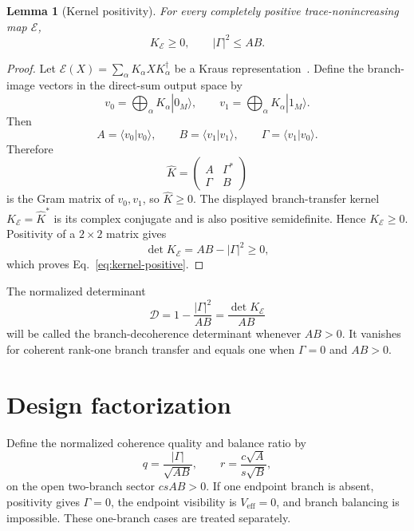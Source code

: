 \documentclass[reprint,aps,pra,superscriptaddress,nofootinbib,longbibliography]{revtex4-2}
\newtheorem{lemma}[theorem]{Lemma}
\newcommand{\ket}[1]{|#1\rangle}
\newcommand{\Veff}{V_{\mathrm{eff}}}
\newcommand{\Ddec}{\mathcal D}
\newcommand{\Kbr}{K_{\mathcal E}}
\begin{document}
\begin{lemma}[Kernel positivity]
For every completely positive trace-nonincreasing map \(\mathcal E\),
\begin{equation}
\Kbr\ge0,
\qquad
|\Gamma|^2\le AB.
\label{eq:kernel-positive}
\end{equation}
\end{lemma}

\begin{proof}
Let \(\mathcal E(X)=\sum_\alpha K_\alpha X K_\alpha^\dagger\) be a Kraus representation~\cite{NielsenChuang}.  Define the branch-image vectors in the direct-sum output space by
\begin{equation}
v_0=\bigoplus_\alpha K_\alpha\ket{0_M},
\qquad
v_1=\bigoplus_\alpha K_\alpha\ket{1_M}.
\end{equation}
Then
\begin{equation}
A=\langle v_0|v_0\rangle,
\qquad
B=\langle v_1|v_1\rangle,
\qquad
\Gamma=\langle v_1|v_0\rangle .
\end{equation}
Therefore
\begin{equation}
\widehat K=
\begin{pmatrix}
A&\Gamma^*\\
\Gamma&B
\end{pmatrix}
\end{equation}
is the Gram matrix of \(v_0,v_1\), so \(\widehat K\ge0\).  The displayed branch-transfer kernel \(\Kbr=\widehat K^*\) is its complex conjugate and is also positive semidefinite.  Hence \(\Kbr\ge0\).  Positivity of a \(2\times2\) matrix gives
\begin{equation}
\det\Kbr=AB-|\Gamma|^2\ge0,
\end{equation}
which proves Eq.~\eqref{eq:kernel-positive}.
\end{proof}

The normalized determinant
\begin{equation}
\Ddec=1-\frac{|\Gamma|^2}{AB}
=\frac{\det\Kbr}{AB}
\label{eq:Ddec}
\end{equation}
will be called the branch-decoherence determinant whenever \(AB>0\).  It vanishes for coherent rank-one branch transfer and equals one when \(\Gamma=0\) and \(AB>0\).

\section{Design factorization}

Define the normalized coherence quality and balance ratio by
\begin{equation}
q=\frac{|\Gamma|}{\sqrt{AB}},
\qquad
r=\frac{c\sqrt A}{s\sqrt B},
\label{eq:q-r-def}
\end{equation}
on the open two-branch sector \(csAB>0\).  If one endpoint branch is absent, positivity gives \(\Gamma=0\), the endpoint visibility is \(\Veff=0\), and branch balancing is impossible.  These one-branch cases are treated separately.
\end{document}
